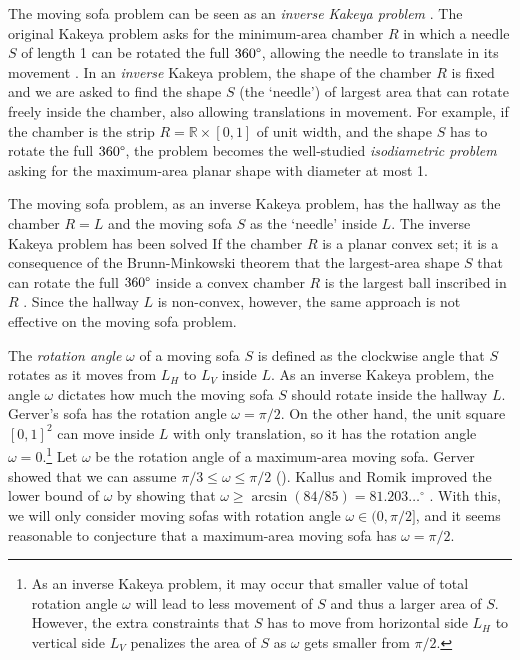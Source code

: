 The moving sofa problem can be seen as an \emph{inverse Kakeya problem} \autocite{bae2021reverse,cabelloInverseKakeyaProblem2022}. The original Kakeya problem asks for the minimum-area chamber \(R\) in which a needle \(S\) of length 1 can be rotated the full \(360\degree\), allowing the needle to translate in its movement \autocite{kakeya1917some}. In an \emph{inverse} Kakeya problem, the shape of the chamber \(R\) is fixed and we are asked to find the shape \(S\) (the ‘needle’) of largest area that can rotate freely inside the chamber, also allowing translations in movement. For example, if the chamber is the strip \(R = \mathbb{R} \times [0, 1]\) of unit width, and the shape \(S\) has to rotate the full \(360\degree\), the problem becomes the well-studied \emph{isodiametric problem} asking for the maximum-area planar shape with diameter at most 1.

The moving sofa problem, as an inverse Kakeya problem, has the hallway as the chamber \(R = L\) and the moving sofa \(S\) as the ‘needle’ inside \(L\). The inverse Kakeya problem has been solved If the chamber \(R\) is a planar convex set; it is a consequence of the Brunn-Minkowski theorem that the largest-area shape \(S\) that can rotate the full \(360\degree\) inside a convex chamber \(R\) is the largest ball inscribed in \(R\) \autocite{cabelloInverseKakeyaProblem2022}. Since the hallway \(L\) is non-convex, however, the same approach is not effective on the moving sofa problem.

The \emph{rotation angle} \(\omega\) of a moving sofa \(S\) is defined as the clockwise angle that \(S\) rotates as it moves from \(L_H\) to \(L_V\) inside \(L\). As an inverse Kakeya problem, the angle \(\omega\) dictates how much the moving sofa \(S\) should rotate inside the hallway \(L\). Gerver’s sofa has the rotation angle \(\omega = \pi/2\). On the other hand, the unit square \([0, 1]^2\) can move inside \(L\) with only translation, so it has the rotation angle \(\omega = 0\).\footnote{As an inverse Kakeya problem, it may occur that smaller value of total rotation angle \(\omega\) will lead to less movement of \(S\) and thus a larger area of \(S\). However, the extra constraints that \(S\) has to move from horizontal side \(L_H\) to vertical side \(L_V\) penalizes the area of \(S\) as \(\omega\) gets smaller from \(\pi/2\).} Let \(\omega\) be the rotation angle of a maximum-area moving sofa. Gerver showed that we can assume \(\pi/ 3 \leq \omega \leq \pi/2\) (\autocite{gerverMovingSofaCorner1992}). Kallus and Romik improved the lower bound of \(\omega\) by showing that \(\omega \geq \arcsin(84/85) = 81.203\dots^\circ\) \autocite{kallusImprovedUpperBounds2018}. With this, we will only consider moving sofas with rotation angle \(\omega \in (0, \pi/2]\), and it seems reasonable to conjecture that a maximum-area moving sofa has \(\omega = \pi/2\).

